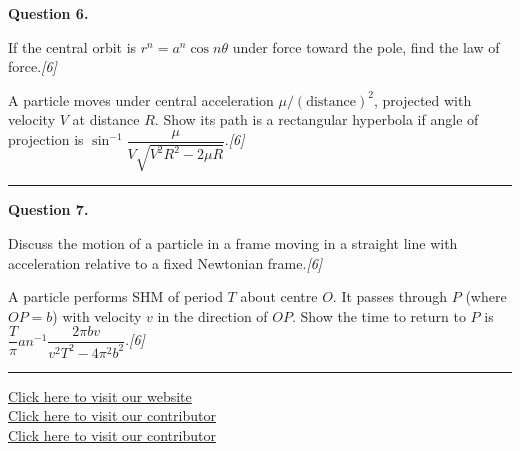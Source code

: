 \documentclass[11pt,a4paper]{article}
\newcommand{\pts}[1]{\hfill   \textit{[#1]}}
\begin{document}
\medskip


\noindent   \textbf{Question 6.}

\begin{parts}
  \item If the central orbit is $r^n=a^n\cos n \theta$ under force toward the pole, find the law of force.\pts{6}
  \item A particle moves under central acceleration $\mu/( \text{distance})^2$, projected with velocity $V$ at distance $R$. Show its path is a rectangular hyperbola if angle of projection is $\sin^{-1}\dfrac{\mu}{V\sqrt{V^2R^2-2\mu R}}$.\pts{6}
\end{parts}
\medskip\rule{\linewidth}{0.2pt}

\medskip


\noindent   \textbf{Question 7.}

\begin{parts}
  \item Discuss the motion of a particle in a frame moving in a straight line with acceleration relative to a fixed Newtonian frame.\pts{6}
  \item A particle performs SHM of period $T$ about centre $O$. It passes through $P$ (where $OP=b$) with velocity $v$ in the direction of $OP$. Show the time to return to $P$ is $\dfrac{T}{\pi} an^{-1}\!\dfrac{2\pi bv}{v^2T^2-4\pi^2b^2}$.\pts{6}
\end{parts}

\vfill\rule{\linewidth}{0.4pt}

\begin{center}\small
\href{https://bhu-exam.vercel.app/}{Click here to visit our website}\\[4pt]
\href{https://me-aryan.vercel.app/}{Click here to visit our contributor}\\[4pt]
\href{https://quashan-me.vercel.app/}{Click here to visit our contributor}
\end{center}
\end{document}
